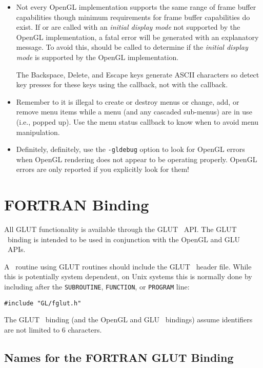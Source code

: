 \begin{itemize}
\item
Not every OpenGL implementation supports the same range of
frame buffer capabilities though minimum requirements for
frame buffer capabilities do exist.  If 
or  are called with an {\em initial
display mode} not supported by the OpenGL implementation,
a fatal error will be generated with an explanatory message.
To avoid this, 
should be called to determine if the {\em initial
display mode} is supported by the OpenGL implementation.

The Backspace, Delete, and Escape keys generate ASCII characters so detect
key presses for these keys using the  callback, not
with the  callback.

\item
Remember to it is illegal to create or destroy menus or change, add, or
remove menu items while a menu (and any cascaded sub-menus) are in use
(i.e., popped up).  Use the menu status callback to know when to
avoid menu manipulation.

\item
Definitely, definitely, use the {\tt -gldebug} option to look
for OpenGL errors when OpenGL rendering does not appear to
be operating properly.  OpenGL errors are only reported if
you explicitly look for them!

\end{itemize}

\section{FORTRAN Binding}

All GLUT functionality is available through the GLUT \Fortran\ API.
The GLUT \Fortran\ binding is intended to be used in conjunction with the OpenGL and GLU
\Fortran\ APIs.

A \Fortran\ routine using GLUT routines should include the GLUT \Fortran\
header file.  While this is potentially system dependent, on Unix
systems this is normally done by including after the {\tt SUBROUTINE},
{\tt FUNCTION}, or {\tt PROGRAM} line:
\begin{verbatim}
#include "GL/fglut.h"
\end{verbatim}

The GLUT \Fortran\ binding (and the OpenGL and GLU \Fortran\ bindings)
assume identifiers are not limited to 6 characters.

\subsection{Names for the FORTRAN GLUT Binding}

